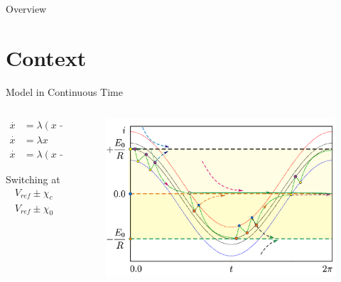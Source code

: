
\begin{frame}{Overview}
	\tableofcontents
\end{frame}

\section{Context}

\begin{frame}{Model in Continuous Time}
	\vspace{-1em}
	\begin{columns}
		\begin{column}{.3 \textwidth}
			\begin{align*}
				\overset{\cdot}{x} & = \lambda (x - 1) \quad & \text{if } & K_{F} = +1 \\
				\overset{\cdot}{x} & = \lambda x       \quad & \text{if } & K_{F} = 0  \\
				\overset{\cdot}{x} & = \lambda (x + 1) \quad & \text{if } & K_{F} = -1
			\end{align*}

			Switching at
			\begin{align*}
				V_{ref} \pm \chi_{c} \\
				V_{ref} \pm \chi_{0}
			\end{align*}
		\end{column}
		\begin{column}{.7 \textwidth}
			\begin{figure}
				\includegraphics[width=0.7 \textwidth]{Figs/continuous_model.png}
			\end{figure}

			\flushright{[Zhusubaliyev]}
		\end{column}
	\end{columns}
\end{frame}

